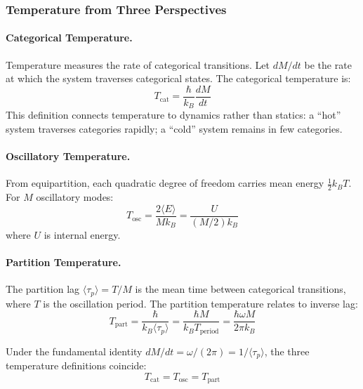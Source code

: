 \subsubsection{Temperature from Three Perspectives}

\paragraph{Categorical Temperature.}
Temperature measures the rate of categorical transitions. Let $dM/dt$ be the rate at which the system traverses categorical states. The categorical temperature is:
\begin{equation}
T_{\text{cat}} = \frac{\hbar}{k_B} \frac{dM}{dt}
\label{eq:categorical_temperature}
\end{equation}
This definition connects temperature to dynamics rather than statics: a ``hot'' system traverses categories rapidly; a ``cold'' system remains in few categories.

\paragraph{Oscillatory Temperature.}
From equipartition, each quadratic degree of freedom carries mean energy $\frac{1}{2}k_B T$. For $M$ oscillatory modes:
\begin{equation}
T_{\text{osc}} = \frac{2\langle E \rangle}{M k_B} = \frac{U}{(M/2) k_B}
\label{eq:oscillatory_temperature}
\end{equation}
where $U$ is internal energy.

\paragraph{Partition Temperature.}
The partition lag $\langle\tau_p\rangle = T/M$ is the mean time between categorical transitions, where $T$ is the oscillation period. The partition temperature relates to inverse lag:
\begin{equation}
T_{\text{part}} = \frac{\hbar}{k_B \langle\tau_p\rangle} = \frac{\hbar M}{k_B T_{\text{period}}} = \frac{\hbar \omega M}{2\pi k_B}
\label{eq:partition_temperature}
\end{equation}

\begin{proposition}
\label{prop:temperature_equivalence}
Under the fundamental identity $dM/dt = \omega/(2\pi) = 1/\langle\tau_p\rangle$, the three temperature definitions coincide:
\begin{equation}
T_{\text{cat}} = T_{\text{osc}} = T_{\text{part}}
\end{equation}
\end{proposition}

